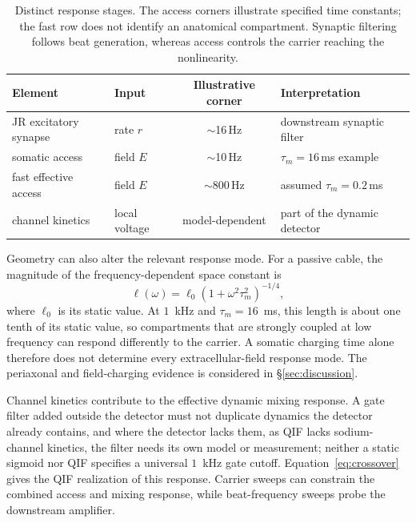\documentclass[11pt,a4paper]{article}
\begin{document}
\begin{table}[h]
\centering\small
\renewcommand{\arraystretch}{1.15}
\begin{tabular}{@{}p{4.3cm} l c p{3.3cm}@{}}
\toprule
Element & Input & Illustrative corner & Interpretation \\
\midrule
JR excitatory synapse & rate $r$ & $\sim$16\,Hz & downstream synaptic filter \\
somatic access & field $E$ & $\sim$10\,Hz & $\tau_m=16$\,ms example \\
fast effective access & field $E$ & $\sim$800\,Hz & assumed $\tau_m=0.2$\,ms \\
channel kinetics & local voltage & model-dependent & part of the dynamic detector \\
\bottomrule
\end{tabular}
\caption{Distinct response stages. The access corners illustrate specified time
constants; the fast row does not identify an anatomical compartment. Synaptic
filtering follows beat generation, whereas access controls the carrier reaching
the nonlinearity.}
\label{tab:doors}
\end{table}

Geometry can also alter the relevant response mode. For a passive cable, the
magnitude of the frequency-dependent space constant is
\begin{equation}
\ell(\omega)=\ell_0(1+\omega^2\tau_m^2)^{-1/4},
\label{eq:lambda}
\end{equation}
where $\ell_0$ is its static value. At $1$~kHz and $\tau_m=16$~ms, this length
is about one tenth of its static value, so compartments that are strongly coupled
at low frequency can respond differently to the carrier. A somatic charging time
alone therefore does not determine every extracellular-field response mode.
The periaxonal and field-charging evidence is considered in \S\ref{sec:discussion}.

Channel kinetics contribute to the effective dynamic mixing response. A gate
filter added outside the detector must not duplicate dynamics the detector already
contains, and where the detector lacks them, as QIF lacks sodium-channel kinetics,
the filter needs its own model or measurement; neither a static sigmoid nor QIF
specifies a universal $1$~kHz gate cutoff.
Equation~\eqref{eq:crossover} gives the QIF realization of this response.
Carrier sweeps can constrain the
combined access and mixing response, while beat-frequency sweeps probe the
downstream amplifier.
\end{document}
